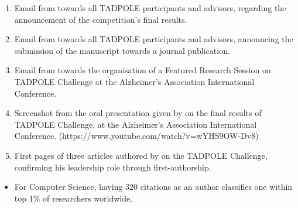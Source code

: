 \documentclass[11pt]{article}
\begin{document}
  \vspace{-7em}
  \begin{enumerate}
   \item Email from \dr towards all TADPOLE participants and advisors, regarding the announcement of the competition's final results.
   \item Email from \dr towards all TADPOLE participants and advisors, announcing the submission of the manuscript towards a journal publication.
   \item Email from \dr towards the organisation of a Featured Research Session on TADPOLE Challenge at the Alzheimer's Association International Conference.
   \item Screenshot from the oral presentation given by \dr on the final results of TADPOLE Challenge, at the Alzheimer's Association International Conference. (https://www.youtube.com/watch?v=wYHS9OW-Dv8)
   \item First pages of three articles authored by \dr on the TADPOLE Challenge, confirming his leadership role through first-authorship.
  \end{enumerate}



  \vspace{-7em}
  \begin{itemize}
   \item For Computer Science, having 320 citations as an author classifies one within top 1\% of researchers worldwide. 
  \end{itemize}

\end{document}
